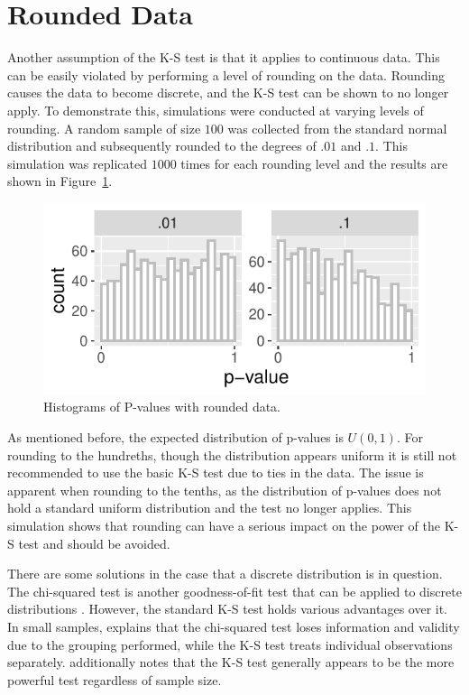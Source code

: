 \documentclass[12pt, letterpaper, titlepage]{article}
\begin{document}
\hypertarget{sec:rounded}{%
\section{Rounded Data}\label{sec:rounded}}

Another assumption of the K-S test is that it applies to continuous data. This can be easily violated by performing a level of rounding on the data. Rounding causes the data to become discrete, and the K-S test can be shown to no longer apply. To demonstrate this, simulations were conducted at varying levels of rounding. A random sample of size $100$ was collected from the standard normal distribution and subsequently rounded to the degrees of $.01$ and  $.1$. This simulation was replicated $1000$ times for each rounding level and the results are shown in Figure~\ref{fig:hist_rounded}.

\begin{figure}[!ht]
  \centering
  \includegraphics[scale=0.7]{hist_rounded}
  \caption{Histograms of P-values with rounded data.}
  \label{fig:hist_rounded}
\end{figure}

As mentioned before, the expected distribution of p-values is $U(0,1)$. For rounding to the hundreths, though the distribution appears uniform it is still not recommended to use the basic K-S test due to ties in the data. The issue is apparent when rounding to the tenths, as the distribution of p-values does not hold a standard uniform distribution and the test no longer applies. This simulation shows that rounding can have a serious impact on the power of the K-S test and should be avoided.

There are some solutions in the case that a discrete distribution is in question. The chi-squared test is another goodness-of-fit test that can be applied to discrete distributions \citep{Massey}. However, the standard K-S test holds various advantages over it. In small samples, \citet{Massey} explains that the chi-squared test loses information and validity due to the grouping performed, while the K-S test treats individual observations separately. \citet{Massey} additionally notes that the K-S test generally appears to be the more powerful test regardless of sample size.
\end{document}
